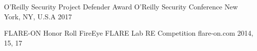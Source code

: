 

\begin{cvhonors}


\cvhonor
{O'Reilly Security Project Defender Award} %
{O'Reilly Security Conference} %
{New York, NY, U.S.A} %
{2017} %


\cvhonor
{FLARE-ON Honor Roll} %
{FireEye FLARE Lab RE Competition} %
{flare-on.com} %
{2014, 15, 17} %


\end{cvhonors}
